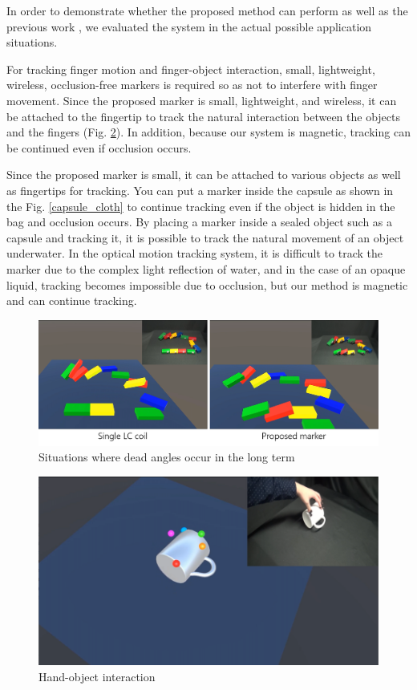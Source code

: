 \documentclass[journal,twoside,web]{ieeecolor}
\begin{document}
In order to demonstrate whether the proposed method can perform as well as the previous work \cite{im3d, im6d, im3d+}, we evaluated the system in the actual possible application situations.

For tracking finger motion and finger-object interaction, small, lightweight, wireless, occlusion-free markers is required so as not to interfere with finger movement. Since the proposed marker is small, lightweight, and wireless, it can be attached to the fingertip to track the natural interaction between the objects and the fingers (Fig. \ref{mug}). In addition, because our system is magnetic, tracking can be continued even if occlusion occurs.

Since the proposed marker is small, it can be attached to various objects as well as fingertips for tracking. You can put a marker inside the capsule as shown in the Fig. \ref{capsule_cloth} to continue tracking even if the object is hidden in the bag and occlusion occurs.
By placing a marker inside a sealed object such as a capsule and tracking it, it is possible to track the natural movement of an object underwater. In the optical motion tracking system, it is difficult to track the marker due to the complex light reflection of water, and in the case of an opaque liquid, tracking becomes impossible due to occlusion, but our method is magnetic and can continue tracking.
\begin{figure}[t]
    \centerline{\includegraphics[width=\columnwidth]{figure/domino.png}}
    \caption{Situations where dead angles occur in the long term}
    \label{domino}
\end{figure}
\begin{figure}[t]
    \centerline{\includegraphics[width=\columnwidth]{figure/mug.png}}
    \caption{Hand-object interaction}
    \label{mug}
\end{figure}
\end{document}
